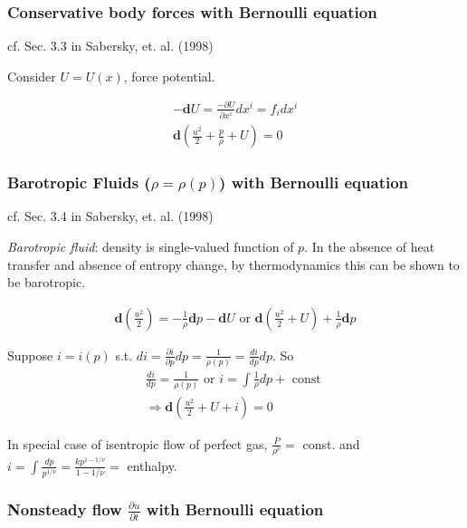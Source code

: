 \subsubsection{Conservative body forces with Bernoulli equation}

cf. Sec. 3.3 in Sabersky, et. al. (1998) \cite{dgdt:SAHG1998}

Consider $U= U(x)$, force potential. 

\[
\begin{gathered}
	-\mathbf{d}U = \frac{ - \partial U}{\partial x^i} dx^i = f_i dx^i \\
 \mathbf{d}\left( \frac{u^2}{2} + \frac{p}{\rho} + U \right) = 0 
\end{gathered}
\]

\subsubsection{Barotropic Fluids ($\rho = \rho(p)$) with Bernoulli equation}

cf. Sec. 3.4 in Sabersky, et. al. (1998) \cite{dgdt:SAHG1998}

\emph{Barotropic fluid}: density is single-valued function of $p$. In the absence of heat transfer and absence of entropy change, by thermodynamics this can be shown to be barotropic.

\[
\begin{gathered}
\mathbf{d} \left( \frac{u^2}{2} \right) = -\frac{1}{\rho} \mathbf{d}p - \mathbf{d}U \text{ or } \mathbf{d} \left( \frac{u^2}{2} + U \right) + \frac{1}{\rho} \mathbf{d}p
\end{gathered}
\]

Suppose $i=i(p)$ s.t. $di = \frac{\partial i}{\partial p} dp = \frac{1}{\rho (p)} = \frac{di}{dp} dp$. So
\[
\begin{gathered}
\frac{di}{dp} = \frac{1}{\rho(p)} \text{ or } i = \int \frac{1}{\rho} dp + \text{ const } \\
\Longrightarrow \mathbf{d} \left( \frac{u^2}{2} + U + i \right) = 0 
\end{gathered}
\]

In special case of isentropic flow of perfect gas, $\frac{P}{\rho^{\nu}} = $ const. and $ i =\int \frac{dp}{p^{1/\nu}} = \frac{kp^{1-1/\nu}}{1- 1/\nu} = $ enthalpy.

\subsubsection{Nonsteady flow $\frac{\partial u}{\partial t}$ with Bernoulli equation}

